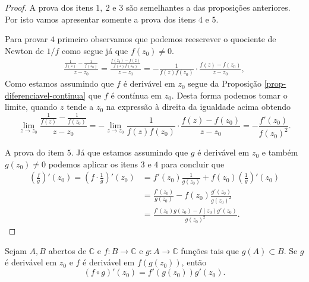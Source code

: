 \begin{proof}
A prova dos itens $\mathit{1},\ \mathit{2}$ e $\mathit{3}$ são semelhantes a das proposições anteriores.
Por isto vamos apresentar somente a prova dos itens $\mathit{4}$ e $\mathit{5}$.

Para provar $\mathit{4}$ primeiro observamos que podemos reescrever o 
quociente de Newton de $1/f$ como segue já que  $f(z_0)\neq 0$. 
\begin{align*}
\frac{ \displaystyle \frac{1}{f(z)}  -  \frac{1}{f(z_0)}  }{z-z_0}
=
\frac{ \displaystyle  \frac{ f(z_0)-f(z) }{ f(z)f(z_0) }    }{z-z_0}
=
- \frac{1}{f(z)f(z_0)}\cdot   \frac{f(z)-f(z_0)}{z-z_0},
\end{align*}
Como estamos assumindo que $f$ é derivável em $z_0$ segue da Proposição \ref{prop-diferenciavel-continua}
que $f$ é contínua em $z_0$. Desta forma podemos tomar o limite, quando $z$ tende a $z_0$ na expressão 
à direita da igualdade acima obtendo 
\[
\lim_{z\to z_0} \frac{ \displaystyle \frac{1}{f(z)}  -  \frac{1}{f(z_0)}  }{z-z_0}
 = 
- \lim_{z\to z_0} \frac{1}{f(z)f(z_0)}\cdot   \frac{f(z)-f(z_0)}{z-z_0}
=
-\frac{f'(z_0)}{f(z_0)^2}.
\]

A prova do item $\mathit{5}$. Já que estamos assumindo que $g$ é derivável em $z_0$ e também $g(z_0)\neq 0$
podemos aplicar os itens $\mathit{3}$ e $\mathit{4}$ para concluir que 
\begin{align*}
\left( \frac{f}{g} \right)'(z_0) 
=
\left( f \cdot \frac{1}{g}\right)'(z_0)
&=
f'(z_0) \frac{1}{g(z_0)} + f(z_0)\left( \frac{1}{g}\right)'(z_0)
\\[0.3cm]
&=
 \frac{f'(z_0)}{g(z_0)}  -f(z_0)\frac{g'(z_0)}{g(z_0)^2}
\\[0.2cm]
&=
\frac{f'(z_0)g(z_0)-f(z_0)g'(z_0)}{g(z_0)^2}. 
\end{align*} 
\end{proof}

\begin{teorema}
\label{teo-regra-da-cadeia}
Sejam $A, B$ abertos de $\mathbb{C}$ e $f:B\to\mathbb{C}$ e $g:A\to\mathbb{C}$ funções tais que $g(A)\subset B$.
Se $g$ é derivável em $z_0$ e $f$ é derivável em $f(g(z_0))$, então 
\[
(f\circ g)'(z_0) = f'(g(z_0))g'(z_0).
\]
\end{teorema}

